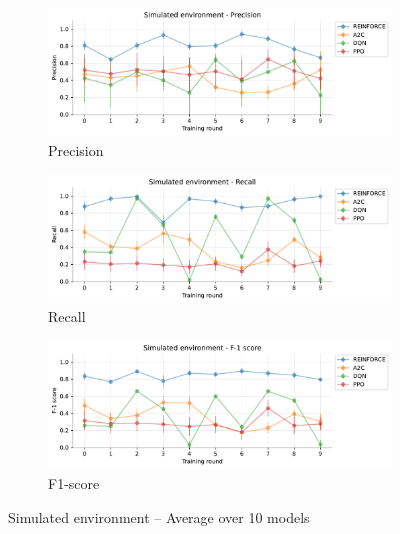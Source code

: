 \documentclass[a4paper, 12pt]{article}
\begin{document}
\begin{appendices}
\begin{figure}[h]
	\begin{subfigure}{\textwidth}
		\centering
		\includegraphics[width=\linewidth]{Simulated_Pr.pdf}  
		\caption{Precision}
		\label{fig:tr-sim-pr}
	\end{subfigure} \par\smallskip
	
	\begin{subfigure}{\textwidth}
		\centering
		\includegraphics[width=\linewidth]{Simulated_Rc.pdf}  
		\caption{Recall}
		\label{fig:tr-sim-rc}
	\end{subfigure} \par\smallskip
	
	\begin{subfigure}{\textwidth}
		\centering
		\includegraphics[width=\linewidth]{Simulated_F1.pdf}  
		\caption{F1-score}
		\label{fig:tr-sim-f1}
	\end{subfigure} \par\smallskip
	
	
	\caption{Simulated environment -- Average over 10 models}
	\label{fig:tr-sim-env}
\end{figure}


\end{appendices}
\end{document}
